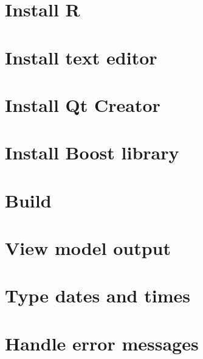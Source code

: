 \documentclass [a4paper, 11pt, openany]  {memoir}
\begin{document}
\chapter{Install R}

\chapter{Install text editor}

\chapter{Install Qt Creator}

\chapter{Install Boost library}

\chapter{Build \protect\US}

\chapter{View model output}

\chapter{Type dates and times}

\chapter{Handle error messages}




\end{document}
